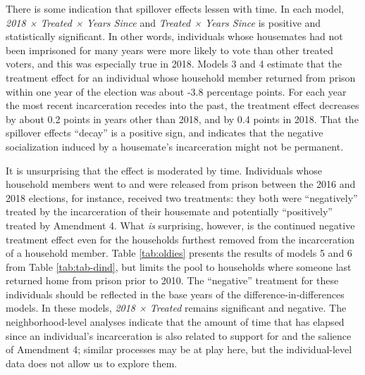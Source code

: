 \documentclass[
  12pt,
]{article}
\begin{document}
There is some indication that spillover effects lessen with time. In each model, \emph{2018 × Treated × Years Since} and \emph{Treated × Years Since} is positive and statistically significant. In other words, individuals whose housemates had not been imprisoned for many years were more likely to vote than other treated voters, and this was especially true in 2018. Models 3 and 4 estimate that the treatment effect for an individual whose household member returned from prison within one year of the election was about -3.8 percentage points. For each year the most recent incarceration recedes into the past, the treatment effect decreases by about 0.2 points in years other than 2018, and by 0.4 points in 2018. That the spillover effects ``decay'' is a positive sign, and indicates that the negative socialization induced by a housemate's incarceration might not be permanent.

It is unsurprising that the effect is moderated by time. Individuals whose household members went to and were released from prison between the 2016 and 2018 elections, for instance, received two treatments: they both were ``negatively'' treated by the incarceration of their housemate and potentially ``positively'' treated by Amendment 4. What \emph{is} surprising, however, is the continued negative treatment effect even for the households furthest removed from the incarceration of a household member. Table \ref{tab:oldies} presents the results of models 5 and 6 from Table \ref{tab:tab-dind}, but limits the pool to households where someone last returned home from prison prior to 2010. The ``negative'' treatment for these individuals should be reflected in the base years of the difference-in-differences models. In these models, \emph{2018 × Treated} remains significant and negative. The neighborhood-level analyses indicate that the amount of time that has elapsed since an individual's incarceration is also related to support for and the salience of Amendment 4; similar processes may be at play here, but the individual-level data does not allow us to explore them.

\begin{singlespace}

\end{singlespace}
\end{document}
